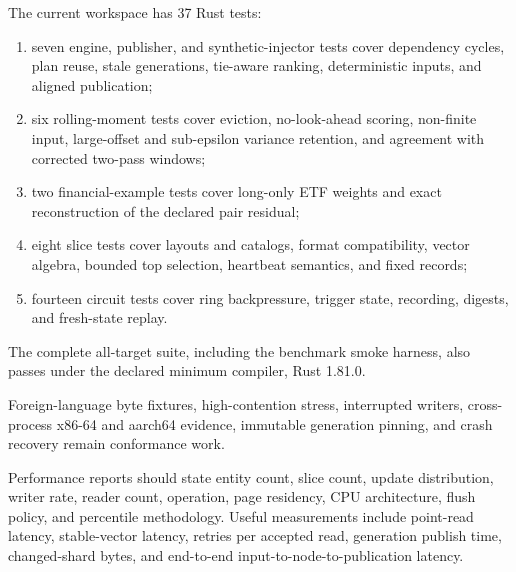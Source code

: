 \documentclass{strategynet-journal}
\begin{document}
The current workspace has 37 Rust tests:
\begin{enumerate}
  \item seven engine, publisher, and synthetic-injector tests cover dependency
        cycles, plan reuse, stale generations, tie-aware ranking, deterministic
        inputs, and aligned publication;
  \item six rolling-moment tests cover eviction, no-look-ahead scoring,
        non-finite input, large-offset and sub-epsilon variance retention, and
        agreement with corrected two-pass windows;
  \item two financial-example tests cover long-only ETF weights and exact
        reconstruction of the declared pair residual;
  \item eight slice tests cover layouts and catalogs, format compatibility,
        vector algebra, bounded top selection, heartbeat semantics, and fixed
        records;
  \item fourteen circuit tests cover ring backpressure, trigger state,
        recording, digests, and fresh-state replay.
\end{enumerate}
The complete all-target suite, including the benchmark smoke harness, also
passes under the declared minimum compiler, Rust 1.81.0.

Foreign-language byte fixtures, high-contention stress, interrupted writers,
cross-process x86-64 and aarch64 evidence, immutable generation pinning, and
crash recovery remain conformance work.

Performance reports should state entity count, slice count, update
distribution, writer rate, reader count, operation, page residency, CPU
architecture, flush policy, and percentile methodology.  Useful
measurements include point-read latency, stable-vector latency, retries per
accepted read, generation publish time, changed-shard bytes, and end-to-end
input-to-node-to-publication latency.
\end{document}
